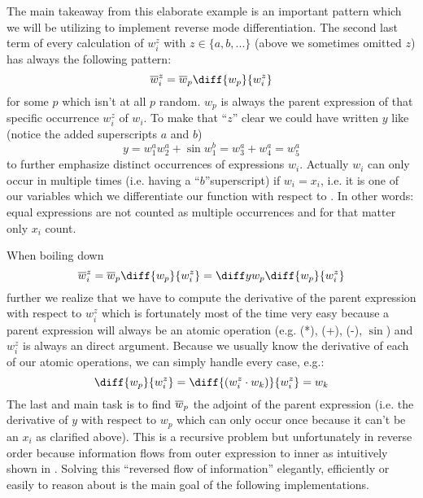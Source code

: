 The main takeaway from this elaborate \todowording example is an important pattern which we will be utilizing to implement reverse mode differentiation. The second last term of every calculation of $w_i^z$ with $z \in \{a, b, ...\}$ (above we sometimes omitted $z$)  has always the following pattern:
\newcommand{\defoverwiz}{\overw{i}^z = \overw{p}\diff{w_p}{w_i^z}}
\[ \defoverwiz \]
for some $p$ which isn't at all $p$ random. $w_p$ is always the parent expression of that specific occurrence $w_i^z$ of $w_i$. To make that ``$z$'' clear we could have written $y$ like (notice the added superscripts $a$ and $b$)
\[ y = w_1^a w_2^a + \sin{w_1^b} = w_3^a + w_4^a = w_5^a \]
to further emphasize distinct occurrences of expressions $w_i$. Actually $w_i$ can only occur in multiple times (i.e. having a ``$b$''superscript) if $w_i = x_i$, i.e. it is one of our variables which we differentiate our function with respect to \todogrammar. In other words: equal expressions are not counted as multiple occurrences and for that matter only $x_i$ count.

When boiling down  
\[ \overw{i}^z = \overw{p}\diff{w_p}{w_i^z} = \diffyw{p}\diff{w_p}{w_i^z} \]
further we realize that we have to compute the derivative of the parent expression with respect to $w_i^z$ which is fortunately most of the time very easy because a parent expression will always be an atomic operation (e.g. (*), (+), (-), $\sin$) and $w_i^z$ is always an direct argument. Because we usually know the derivative of each of our atomic operations, we can simply handle every case, e.g.:
\[ \diff{w_p}{w_i^z} = \diff{(w_i^z \cdot w_k)}{w_i^z} = w_k \]
The last and main task is to find $\overline{w}_p$ the adjoint of the parent expression (i.e. the derivative of $y$ with respect to $w_p$ which can only occur once because it can't be an $x_i$ as clarified above). This is a recursive problem but unfortunately in reverse order because information flows from outer expression to inner  as intuitively shown in . Solving this ``reversed flow of information'' elegantly, efficiently or easily to reason about is the main goal of the following implementations. 

